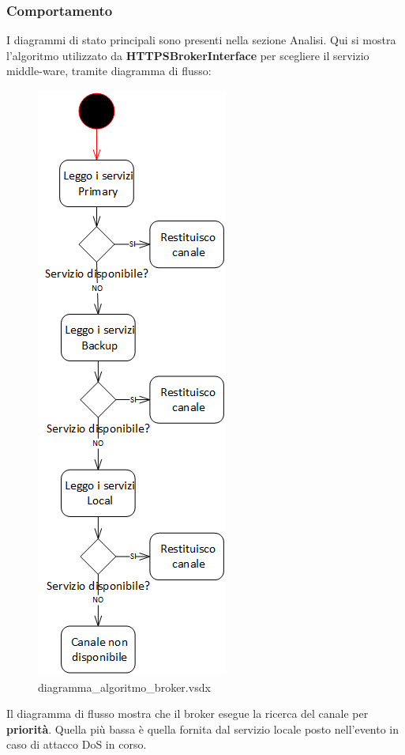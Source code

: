 \documentclass[a4paper]{article}
\begin{document}
\newpage

\subsubsection{Comportamento}

I diagrammi di stato principali sono presenti nella sezione Analisi. Qui si mostra l'algoritmo utilizzato da \textbf{HTTPSBrokerInterface} per scegliere il servizio middle-ware, tramite diagramma di flusso:

\begin{figure}[H]
    \includegraphics[scale=1]{Progettazione/Comportamento/diagramma_algoritmo_broker.png}
    \centering
    \caption{diagramma\_algoritmo\_broker.vsdx}
\end{figure}

Il diagramma di flusso mostra che il broker esegue la ricerca del canale per \textbf{priorità}. Quella più bassa è quella fornita dal servizio locale posto nell'evento in caso di attacco DoS in corso.
\end{document}
